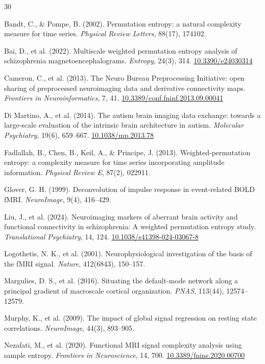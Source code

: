 \documentclass[12pt,a4paper]{article}
\providecommand{\doi}[1]{\href{https://doi.org/#1}{#1}}
\begin{document}
	
	\begin{thebibliography}{30}
		
		Bandt, C., \& Pompe, B. (2002). Permutation entropy: a natural complexity measure for time series. \emph{Physical Review Letters}, 88(17), 174102.
		
		Bai, D., et al. (2022). Multiscale weighted permutation entropy analysis of schizophrenia magnetoencephalograms. \emph{Entropy}, 24(3), 314. \doi{10.3390/e24030314}
		
		Cameron, C., et al. (2013). The Neuro Bureau Preprocessing Initiative: open sharing of preprocessed neuroimaging data and derivative connectivity maps. \emph{Frontiers in Neuroinformatics}, 7, 41. \doi{10.3389/conf.fninf.2013.09.00041}
		
		Di Martino, A., et al. (2014). The autism brain imaging data exchange: towards a large‑scale evaluation of the intrinsic brain architecture in autism. \emph{Molecular Psychiatry}, 19(6), 659–667. \doi{10.1038/mp.2013.78}
		
		Fadlallah, B., Chen, B., Keil, A., \& Principe, J. (2013). Weighted‑permutation entropy: a complexity measure for time series incorporating amplitude information. \emph{Physical Review E}, 87(2), 022911.
		
		Glover, G. H. (1999). Deconvolution of impulse response in event‑related BOLD fMRI. \emph{NeuroImage}, 9(4), 416–429.
		
		Liu, J., et al. (2024). Neuroimaging markers of aberrant brain activity and functional connectivity in schizophrenia: A weighted permutation entropy study. \emph{Translational Psychiatry}, 14, 124. \doi{10.1038/s41398-024-03067-8}
		
		Logothetis, N. K., et al. (2001). Neurophysiological investigation of the basis of the fMRI signal. \emph{Nature}, 412(6843), 150–157.
		
		Margulies, D. S., et al. (2016). Situating the default‑mode network along a principal gradient of macroscale cortical organization. \emph{PNAS}, 113(44), 12574–12579.
		
		Murphy, K., et al. (2009). The impact of global signal regression on resting state correlations. \emph{NeuroImage}, 44(3), 893–905.
		
		Nezafati, M., et al. (2020). Functional MRI signal complexity analysis using sample entropy. \emph{Frontiers in Neuroscience}, 14, 700. \doi{10.3389/fnins.2020.00700}
		

\end{thebibliography}
\end{document}
